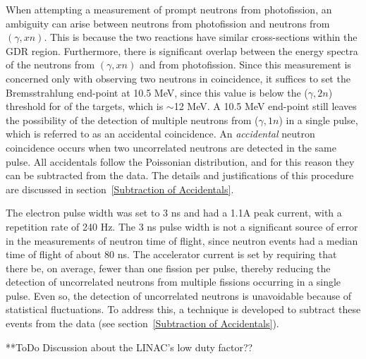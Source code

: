 When attempting a measurement of prompt neutrons from photofission, an ambiguity can arise between neutrons from photofission and neutrons from $(\gamma, xn)$.
This is because the two reactions have similar cross-sections within the GDR region.
Furthermore, there is significant overlap between the energy spectra of the neutrons from $(\gamma, xn)$ and from photofission.
Since this measurement is concerned only with observing two neutrons in coincidence, it suffices to set the Bremsstrahlung end-point at 10.5 MeV, since this value is below the ($\gamma, 2n$) threshold for of the targets, which is $\sim$12 MeV.
A 10.5 MeV end-point still leaves the possibility of the detection of multiple neutrons from ($\gamma, 1n$) in a single pulse, which is referred to as an accidental coincidence.
An \textit{accidental} neutron coincidence occurs when two uncorrelated neutrons are detected in the same pulse.
All accidentals follow the Poissonian distribution, and for this reason they can be subtracted from the data.
The details and justifications of this procedure are discussed in section~\ref{Subtraction of Accidentals}.

The electron pulse width was set to 3 ns and had a 1.1A peak current, with a repetition rate of 240 Hz.
The 3 ns pulse width is not a significant source of error in the measurements of neutron time of flight, since neutron events had a median time of flight of about 80 ns.
The accelerator current is set by requiring that there be, on average, fewer than one fission per pulse, thereby reducing the detection of uncorrelated neutrons from multiple fissions occurring in a single pulse.
Even so, the detection of uncorrelated neutrons is unavoidable because of statistical fluctuations.
To address this, a technique is developed to subtract these events from the data (see section~\ref{Subtraction of Accidentals}).

**ToDo Discussion about the LINAC's low duty factor??

